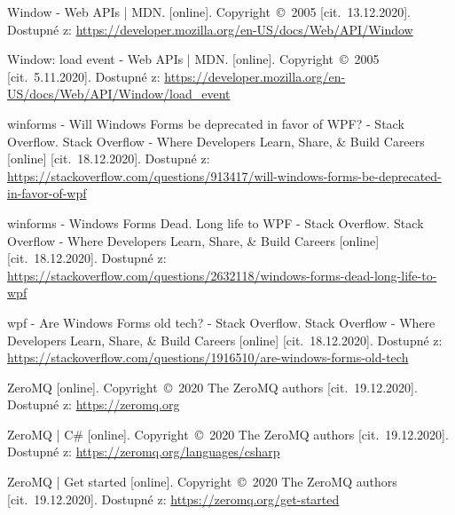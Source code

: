 \begin{thebibliography}{99}
 Window - Web APIs | MDN. [online]. Copyright~©~2005 [cit.~13.12.2020]. Dostupné z: \url{https://developer.mozilla.org/en-US/docs/Web/API/Window}

 Window: load event - Web APIs | MDN. [online]. Copyright~©~2005 [cit.~5.11.2020]. Dostupné z: \url{https://developer.mozilla.org/en-US/docs/Web/API/Window/load_event}

 winforms - Will Windows Forms be deprecated in favor of WPF? - Stack Overflow. Stack Overflow - Where Developers Learn, Share, \& Build Careers [online] [cit.~18.12.2020]. Dostupné z: \url{https://stackoverflow.com/questions/913417/will-windows-forms-be-deprecated-in-favor-of-wpf}

 winforms - Windows Forms Dead. Long life to WPF - Stack Overflow. Stack Overflow - Where Developers Learn, Share, \& Build Careers [online] [cit.~18.12.2020]. Dostupné z: \url{https://stackoverflow.com/questions/2632118/windows-forms-dead-long-life-to-wpf}

 wpf - Are Windows Forms old tech? - Stack Overflow. Stack Overflow - Where Developers Learn, Share, \& Build Careers [online] [cit.~18.12.2020]. Dostupné z: \url{https://stackoverflow.com/questions/1916510/are-windows-forms-old-tech}

 ZeroMQ [online]. Copyright~©~2020 The ZeroMQ authors [cit.~19.12.2020]. Dostupné z: \url{https://zeromq.org}

 ZeroMQ | C\# [online]. Copyright~©~2020 The ZeroMQ authors [cit.~19.12.2020]. Dostupné z: \url{https://zeromq.org/languages/csharp}

 ZeroMQ | Get started [online]. Copyright~©~2020 The ZeroMQ authors [cit.~19.12.2020]. Dostupné z: \url{https://zeromq.org/get-started}

\end{thebibliography}
\newpage